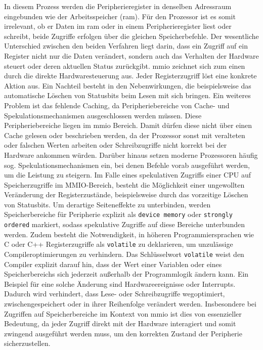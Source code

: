 In diesem Prozess werden die Peripherieregister in denselben Adressraum eingebunden wie der Arbeitsspeicher (\gls{ram}). 
Für den Prozessor ist es somit irrelevant, ob er Daten im \gls{ram} oder in einem Peripherieregister liest oder schreibt, beide Zugriffe erfolgen über die gleichen Speicherbefehle. 
Der wesentliche Unterschied zwischen den beiden Verfahren liegt darin, dass ein Zugriff auf ein Register nicht nur die Daten verändert, sondern auch das Verhalten der Hardware steuert oder deren aktuellen Status zurückgibt.
\gls{mmio} zeichnet sich zum einen durch die direkte Hardwaresteuerung aus.
Jeder Registerzugriff löst eine konkrete Aktion aus.
Ein Nachteil besteht in den Nebenwirkungen, die beispielsweise das automatische Löschen von Statusbits beim Lesen mit sich bringen.
Ein weiteres Problem ist das fehlende Caching, da Peripheriebereiche von Cache- und Spekulationsmechanismen ausgeschlossen werden müssen. 
Diese Peripheriebereiche liegen im \gls{mmio} Bereich.
Damit dürfen diese nicht über einen Cache gelesen oder beschrieben werden, da der Prozessor sonst mit veralteten oder falschen Werten arbeiten oder Schreibzugriffe nicht korrekt bei der Hardware ankommen würden.
Darüber hinaus setzen moderne Prozessoren häufig sog. Spekulationsmechanismen ein, bei denen Befehle vorab ausgeführt werden, um die Leistung zu steigern.
Im Falle eines spekulativen Zugriffs einer CPU auf Speicherzugriffe im MMIO-Bereich, besteht die Möglichkeit einer ungewollten Veränderung der Registerzustände, beispielsweise durch das vorzeitige Löschen von Statusbits.
Um derartige Seiteneffekte zu unterbinden, werden Speicherbereiche für Peripherie explizit als \texttt{device memory} oder \texttt{strongly ordered} markiert, sodass spekulative Zugriffe auf diese Bereiche unterbunden werden.
Zudem besteht die Notwendigkeit, in höheren Programmiersprachen wie C oder C++ Registerzugriffe als \texttt{volatile} zu deklarieren, um unzulässige Compileroptimierungen zu verhindern.
Das Schlüsselwort \texttt{volatile} weist den Compiler explizit darauf hin, dass der Wert einer Variablen oder eines Speicherbereichs sich jederzeit außerhalb der Programmlogik ändern kann. Ein Beispiel für eine solche Änderung sind Hardwareereignisse oder Interrupts.
Dadurch wird verhindert, dass Lese- oder Schreibzugriffe wegoptimiert, zwischengespeichert oder in ihrer Reihenfolge verändert werden.
Insbesondere bei Zugriffen auf Speicherbereiche im Kontext von \gls{mmio} ist dies von essenzieller Bedeutung, da jeder Zugriff direkt mit der Hardware interagiert und somit zwingend ausgeführt werden muss, um den korrekten Zustand der Peripherie sicherzustellen.


